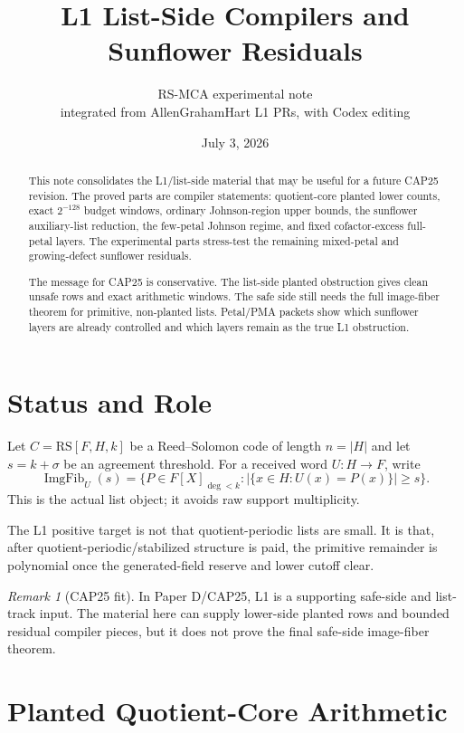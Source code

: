 \documentclass[11pt]{article}
\title{L1 List-Side Compilers and Sunflower Residuals}
\author{RS-MCA experimental note\\ \small integrated from AllenGrahamHart L1 PRs, with Codex editing}
\date{July 3, 2026}
\theoremstyle{definition}
\theoremstyle{remark}
\newtheorem{remark}[theorem]{Remark}
\newcommand{\RS}{\mathrm{RS}}
\newcommand{\ImgFib}{\operatorname{ImgFib}}
\begin{document}
\maketitle

\begin{abstract}
This note consolidates the L1/list-side material that may be useful for a
future CAP25 revision.  The proved parts are compiler statements: quotient-core
planted lower counts, exact $2^{-128}$ budget windows, ordinary Johnson-region
upper bounds, the sunflower auxiliary-list reduction, the few-petal Johnson
regime, and fixed cofactor-excess full-petal layers.  The experimental parts
stress-test the remaining mixed-petal and growing-defect sunflower residuals.

The message for CAP25 is conservative.  The list-side planted obstruction gives
clean unsafe rows and exact arithmetic windows.  The safe side still needs the
full image-fiber theorem for primitive, non-planted lists.  Petal/PMA packets
show which sunflower layers are already controlled and which layers remain as
the true L1 obstruction.
\end{abstract}

\section{Status and Role}

Let $C=\RS[F,H,k]$ be a Reed--Solomon code of length $n=|H|$ and let
$s=k+\sigma$ be an agreement threshold.  For a received word $U:H\to F$, write
\[
        \ImgFib_U(s)=
        \{P\in F[X]_{\deg<k}: |\{x\in H:U(x)=P(x)\}|\ge s\}.
\]
This is the actual list object; it avoids raw support multiplicity.

The L1 positive target is not that quotient-periodic lists are small.  It is
that, after quotient-periodic/stabilized structure is paid, the primitive
remainder is polynomial once the generated-field reserve and lower cutoff clear.

\begin{remark}[CAP25 fit]
In Paper D/CAP25, L1 is a supporting safe-side and list-track input.  The
material here can supply lower-side planted rows and bounded residual compiler
pieces, but it does not prove the final safe-side image-fiber theorem.
\end{remark}

\section{Planted Quotient-Core Arithmetic}
\end{document}
